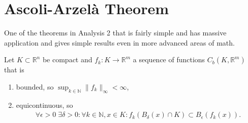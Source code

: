 \section{Ascoli-Arzelà Theorem}

One of the theorems in Analysis 2 that is fairly simple and has massive application and gives simple results even in more advanced areas of math.

\begin{theorem}\label{thm:ascoli-arzela}
	Let $K \subset \mathbb{R}^{n}$ be compact and $f_{k}: K \to \mathbb{R}^{m}$ a sequence of functions $C_{b}(K, \mathbb{R}^{m})$ that is
	\begin{enumerate} 
		\item bounded, so $\sup_{k \in \mathbb{N}} \lVert f_{k} \rVert_{\infty} < \infty$,
		\item equicontinuous, so 
		\begin{align*}
			\forall \epsilon > 0 \; \exists \delta > 0 : \forall k \in \mathbb{N}, x \in K: 
			f_{k}(B_{\delta}(x) \cap K) \subset B_{\epsilon}(f_{k}(x)).
		\end{align*}
	\end{enumerate}
\end{theorem}
